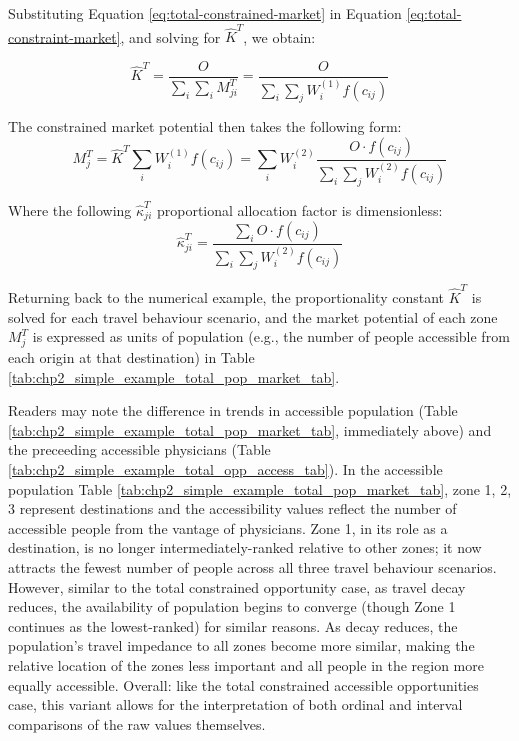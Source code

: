 \documentclass[
11pt, %
oneside, %
english, %
singlespacing, %
]{macthesis} %
\begin{document}
Substituting Equation \ref{eq:total-constrained-market} in Equation \ref{eq:total-constraint-market}, and solving for \(\hat K^T\), we obtain:

\begin{equation}
\label{eq:total-population-balancing-factor}
\hat K^T=\frac{O}{\sum_i\sum_i M^T_{ji}} = \frac{O}{\sum_i\sum_j W^{(1)}_i f(c_{ij})} 
\end{equation} 

The constrained market potential then takes the following form:
\[
M^T_j = \hat K^T\sum_i W^{(1)}_if(c_{ij}) = \sum_i W^{(2)}_i \frac{O \cdot f(c_{ij})}{\sum_i\sum_j W^{(2)}_if(c_{ij})}
\]

Where the following \(\hat \kappa_{ji}^T\) proportional allocation factor is dimensionless:
\[
\hat \kappa_{ji}^T = \frac{\sum_i O \cdot f(c_{ij})}{\sum_i\sum_j W^{(2)}_if(c_{ij})}
\]

Returning back to the numerical example, the proportionality constant \(\hat K^T\) is solved for each travel behaviour scenario, and the market potential of each zone \(M^T_j\) is expressed as units of population (e.g., the number of people accessible from each origin at that destination) in Table \ref{tab:chp2_simple_example_total_pop_market_tab}.



Readers may note the difference in trends in accessible population (Table \ref{tab:chp2_simple_example_total_pop_market_tab}, immediately above) and the preceeding accessible physicians (Table \ref{tab:chp2_simple_example_total_opp_access_tab}). In the accessible population Table \ref{tab:chp2_simple_example_total_pop_market_tab}, zone 1, 2, 3 represent destinations and the accessibility values reflect the number of accessible people from the vantage of physicians. Zone 1, in its role as a destination, is no longer intermediately-ranked relative to other zones; it now attracts the fewest number of people across all three travel behaviour scenarios. However, similar to the total constrained opportunity case, as travel decay reduces, the availability of population begins to converge (though Zone 1 continues as the lowest-ranked) for similar reasons. As decay reduces, the population's travel impedance to all zones become more similar, making the relative location of the zones less important and all people in the region more equally accessible. Overall: like the total constrained accessible opportunities case, this variant allows for the interpretation of both ordinal and interval comparisons of the raw values themselves.
\end{document}
